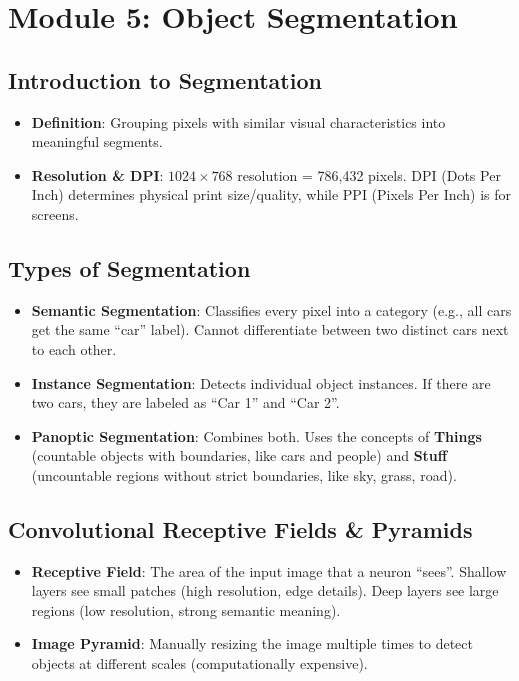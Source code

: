 \documentclass[11pt,a4paper]{article}
\begin{document}
\newpage

\section{Module 5: Object Segmentation}

\subsection{Introduction to Segmentation}
\begin{itemize}
    \item \textbf{Definition}: Grouping pixels with similar visual characteristics into meaningful segments.
    \item \textbf{Resolution \& DPI}: $1024 \times 768$ resolution = 786,432 pixels. DPI (Dots Per Inch) determines physical print size/quality, while PPI (Pixels Per Inch) is for screens.
\end{itemize}

\subsection{Types of Segmentation}
\begin{itemize}
    \item \textbf{Semantic Segmentation}: Classifies every pixel into a category (e.g., all cars get the same ``car'' label). Cannot differentiate between two distinct cars next to each other.
    \item \textbf{Instance Segmentation}: Detects individual object instances. If there are two cars, they are labeled as ``Car 1'' and ``Car 2''.
    \item \textbf{Panoptic Segmentation}: Combines both. Uses the concepts of \textbf{Things} (countable objects with boundaries, like cars and people) and \textbf{Stuff} (uncountable regions without strict boundaries, like sky, grass, road).
\end{itemize}

\subsection{Convolutional Receptive Fields \& Pyramids}
\begin{itemize}
    \item \textbf{Receptive Field}: The area of the input image that a neuron ``sees''. Shallow layers see small patches (high resolution, edge details). Deep layers see large regions (low resolution, strong semantic meaning).
    \item \textbf{Image Pyramid}: Manually resizing the image multiple times to detect objects at different scales (computationally expensive).
\end{itemize}
\end{document}
